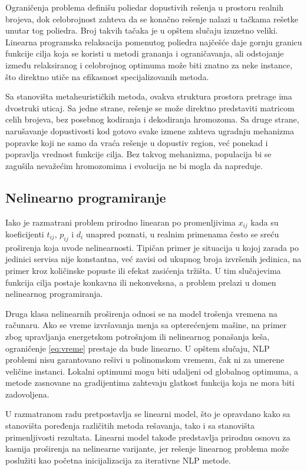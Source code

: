 \documentclass[12pt]{article}
\begin{document}
Ograničenja problema definišu poliedar dopustivih rešenja u prostoru realnih brojeva, dok celobrojnost zahteva da se konačno rešenje nalazi u tačkama rešetke unutar tog poliedra. Broj takvih tačaka je u opštem slučaju izuzetno veliki. Linearna programska relaksacija pomenutog poliedra najčešće daje gornju granicu funkcije cilja koja se koristi u metodi grananja i ograničavanja, ali odstojanje između relaksiranog i celobrojnog optimuma može biti znatno za neke instance, što direktno utiče na efikasnost specijalizovanih metoda.

Sa stanovišta metaheurističkih metoda, ovakva struktura prostora pretrage ima dvostruki uticaj. Sa jedne strane, rešenje se može direktno predstaviti matricom celih brojeva, bez posebnog kodiranja i dekodiranja hromozoma. Sa druge strane, narušavanje dopustivosti kod gotovo svake izmene zahteva ugradnju mehanizma popravke koji ne samo da vraća rešenje u dopustiv region, već ponekad i popravlja vrednost funkcije cilja. Bez takvog mehanizma, populacija bi se zagušila nevažećim hromozomima i evolucija ne bi mogla da napreduje.

\subsection{Nelinearno programiranje}\label{sec:nlp}

Iako je razmatrani problem prirodno linearan po promenljivima $x_{ij}$ kada su koeficijenti $t_{ij}$, $p_{ij}$ i $d_i$ unapred poznati, u realnim primenama često se sreću proširenja koja uvode nelinearnosti. Tipičan primer je situacija u kojoj zarada po jedinici servisa nije konstantna, već zavisi od ukupnog broja izvršenih jedinica, na primer kroz količinske popuste ili efekat zasićenja tržišta. U tim slučajevima funkcija cilja postaje konkavna ili nekonveksna, a problem prelazi u domen nelinearnog programiranja.

Druga klasa nelinearnih proširenja odnosi se na model trošenja vremena na računaru. Ako se vreme izvršavanja menja sa opterećenjem mašine, na primer zbog upravljanja energetskom potrošnjom ili nelinearnog ponašanja keša, ograničenje \eqref{eq:vreme} prestaje da bude linearno. U opštem slučaju, NLP problemi nisu garantovano rešivi u polinomskom vremenu, čak ni za umerene veličine instanci. Lokalni optimumi mogu biti udaljeni od globalnog optimuma, a metode zasnovane na gradijentima zahtevaju glatkost funkcija koja ne mora biti zadovoljena.

U razmatranom radu pretpostavlja se linearni model, što je opravdano kako sa stanovišta poređenja različitih metoda rešavanja, tako i sa stanovišta primenljivosti rezultata. Linearni model takođe predstavlja prirodnu osnovu za kasnija proširenja na nelinearne varijante, jer rešenje linearnog problema može poslužiti kao početna inicijalizacija za iterativne NLP metode.
\end{document}
